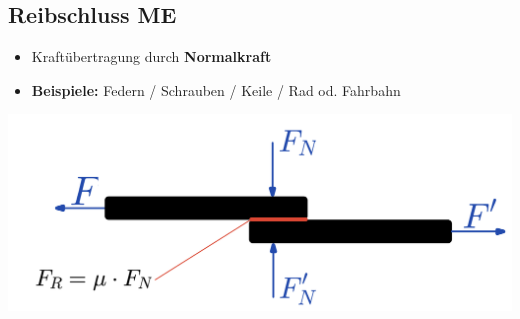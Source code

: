 \subsection{Reibschluss \hfill ME}
\begin{scriptsize}
    \begin{itemize}
        \item Kraftübertragung durch \textbf{Normalkraft}
        \item \textbf{Beispiele:} Federn / Schrauben / Keile / Rad od. Fahrbahn
    \end{itemize}
\end{scriptsize}
\begin{footnotesize}
    \begin{center}
        \includegraphics[width =0.6\linewidth]{src/images/MAEIP_Reibschluss}
    \end{center}
\end{footnotesize}
